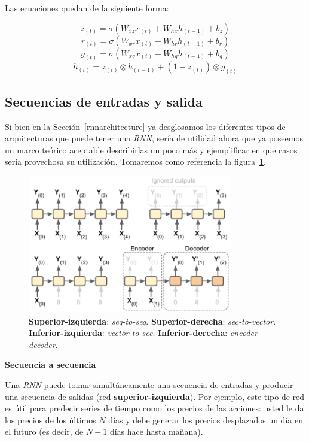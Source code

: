 \documentclass[a4paper,12pt]{article}
\begin{document}
Las ecuaciones quedan de la siguiente forma:

$$z_{(t)}=\sigma(W_{xz}x_{(t)} + W_{hx}h_{(t-1)} + b_z)$$
$$r_{(t)}=\sigma(W_{xr}x_{(t)} + W_{hr}h_{(t-1)} + b_r)$$
$$g_{(t)}=\sigma(W_{xg}x_{(t)} + W_{hg}h_{(t-1)} + b_g)$$
$$h_{(t)}=z_{(t)} \otimes h_{(t-1)} + (1-z_{(t)}) \otimes g_{(t)}$$

\subsection{Secuencias de entradas y salida}

Si bien en la Sección~\ref{rnnarchitecture} ya desglosamos los diferentes tipos de arquitecturas que puede tener una \textit{RNN}, sería de utilidad ahora que ya poseemos un marco teórico aceptable describirlas un poco más y ejemplificar en que casos sería provechosa su utilización. Tomaremos como referencia la figura~\ref{fig:rnnnets}.

\begin{figure}[H]
	\begin{center}				
		\includegraphics[width=0.80\textwidth]{tesis_42.png}
		\caption{\textbf{Superior-izquierda}: \textit{seq-to-seq}. \textbf{Superior-derecha}: \textit{sec-to-vector}. \textbf{Inferior-izquierda}: \textit{vector-to-sec}. \textbf{Inferior-derecha}: \textit{encoder-decoder}. \citep{geron}}
		\label{fig:rnnnets}
	\end{center}
\end{figure}

\textbf{Secuencia a secuencia}

Una \textit{RNN} puede tomar simultáneamente una secuencia de entradas y producir una secuencia de salidas (red \textbf{superior-izquierda}). Por ejemplo, este tipo de red es útil para predecir series de tiempo como los precios de las acciones: usted le da los precios de los últimos $N$ días y debe generar los precios desplazados un día en el futuro (es decir, de $N - 1$ días hace hasta mañana).
\end{document}
